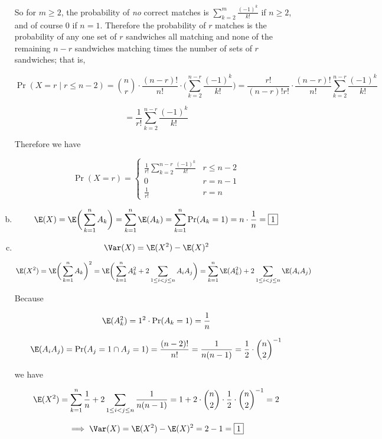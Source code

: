 \begin{solution}
\begin{enumerate}[(a)]

So for \(m \geq 2\), the probability of \textit{no} correct matches is \(\sum_{k=2}^m \frac{(-1)^{k}}{k!}\) if \(n \geq 2\), and of course \(0\) if \(n = 1\). Therefore the probability of \(r\) matches is the probability of any one set of \(r\) sandwiches all matching and none of the remaining \(n-r\) sandwiches matching times the number of sets of \(r\) sandwiches; that is,

\[
\Pr(X=r \mid r \leq n -2) = \binom{n}{r}  \cdot \frac{(n-r)!}{n!} \cdot \bigg( \sum_{k=2}^{n-r} \frac{(-1)^{k}}{k!} \bigg) = \frac{r!}{(n-r)!r!} \cdot \frac{(n-r)!}{n!} \sum_{k=2}^{n-r} \frac{(-1)^{k}}{k!}  
\]

\[
= \frac{1}{r!} \sum_{k=2}^{n-r} \frac{(-1)^{k}}{k!} 
\]

Therefore we have

\[
\boxed{
\Pr(X=r) = \begin{cases}
\frac{1}{r!} \sum_{k=2}^{n-r} \frac{(-1)^{k}}{k!}  & r \leq n-2 \\
0 & r = n -1 \\
\frac{1}{r!} & r=n
\end{cases}
}
\]


\item 

\[
\E(X) = \E \bigg( \sum_{k=1}^n A_k \bigg) = \sum_{k=1}^n \E(A_k) = \sum_{k=1}^n \Pr(A_k = 1) = n \cdot \frac{1}{n} = \boxed{1}
\]

\item 

\[
\Var(X) = \E(X^2) - \E(X)^2 
\]

\[
\E(X^2) = \E \bigg(\sum_{k=1}^n A_k \bigg)^2 = \E \bigg(\sum_{k=1}^n A_k^2 + 2 \sum_{1 \leq i < j \leq n} A_i A_j\bigg) = \sum_{k=1}^n \E(A_k^2 ) + 2 \sum_{1 \leq i < j \leq n}  \E(A_i A_j )
\]

Because

\[
\E(A_k^2) = 1^2 \cdot \Pr(A_k = 1) = \frac{1}{n}
\]

\[
\E(A_i A_j) = \Pr(A_j = 1 \cap A_j = 1) = \frac{(n-2)!}{n!}  =  \frac{1}{n(n-1)} = \frac{1}{2} \cdot \binom{n}{2}^{-1}
\]

we have

\[
\E(X^2) = \sum_{k=1}^n \frac{1}{n} + 2 \sum_{1 \leq i < j \leq n}  \frac{1}{n(n-1)} = 1 + 2 \cdot \binom{n}{2} \cdot \frac{1}{2} \cdot \binom{n}{2}^{-1} = 2
\]

\[
\implies \Var(X) = \E(X^2) - \E(X)^2 = 2 - 1 = \boxed{1}
\]

\end{enumerate}

\end{solution}

